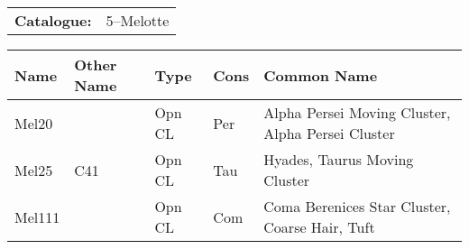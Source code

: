 \begin{tabular}{ p{0.9in} p{1.3in}}
{\bf Catalogue:} & 5--Melotte \\ 
\end{tabular}
\begin{longtable}{ p{0.7in}  p{1.0in}  p{0.6in}  p{0.9in}  p{5.1in} }
\hline 
{\bf Name} & {\bf Other Name} & {\bf Type} & {\bf Cons} & {\bf Common Name} \\ 
\hline 
Mel20 &  & Opn CL & Per & Alpha Persei Moving Cluster, Alpha Persei Cluster \\ 
Mel25 & C41 & Opn CL & Tau & Hyades, Taurus Moving Cluster \\ 
Mel111 &  & Opn CL & Com & Coma Berenices Star Cluster, Coarse Hair, Tuft \\ 
\hline 
\end{longtable} 
